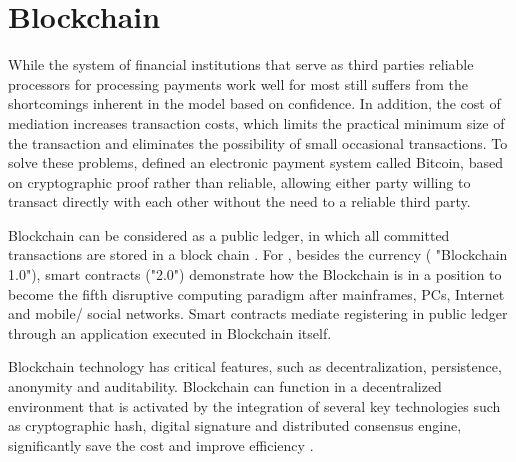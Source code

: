 \section{Blockchain} \label{sec:Theoretical}


%
%
% 
%

While the system of financial institutions that serve as third parties reliable processors for processing payments work well for most still suffers from the shortcomings inherent in the model based on confidence. In addition, the cost of mediation increases transaction costs, which limits the practical minimum size of the transaction and eliminates the possibility of small occasional transactions. To solve these problems, \cite{nakamoto2008bitcoin} defined an electronic payment system called Bitcoin, based on cryptographic proof rather than reliable, allowing either party willing to transact directly with each other without the need to a reliable third party. 

Blockchain can be considered as a public ledger, in which all committed transactions are stored in a block chain \cite{zheng2016blockchain}. For \cite{swan2015blockchain}, besides the currency ( "Blockchain 1.0"), smart contracts ("2.0") demonstrate how the Blockchain is in a position to become the fifth disruptive computing paradigm after mainframes, PCs, Internet and mobile/ social networks. Smart contracts mediate registering in public ledger through an application executed in Blockchain itself.

Blockchain technology has critical features, such as decentralization, persistence, anonymity and auditability. Blockchain can function in a decentralized environment that is activated by the integration of several key technologies such as cryptographic hash, digital signature and distributed consensus engine, significantly save the cost and improve efficiency \cite{zheng2016blockchain}.




